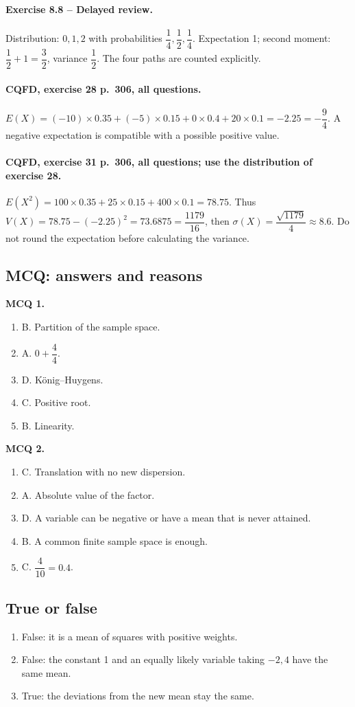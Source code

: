 \paragraph{Exercise 8.8 -- Delayed review.} Distribution: $0,1,2$ with probabilities $\dfrac{1}{4},\dfrac{1}{2},\dfrac{1}{4}$. Expectation 1; second moment: $\dfrac{1}{2}+1=\dfrac{3}{2}$, variance $\dfrac{1}{2}$. The four paths are counted explicitly.
\paragraph{CQFD, exercise 28 p.~306, all questions.} $E(X)=(-10)\times0.35+(-5)\times0.15+0\times0.4+20\times0.1=-2.25=-\dfrac94$. A negative expectation is compatible with a possible positive value.
\paragraph{CQFD, exercise 31 p.~306, all questions; use the distribution of exercise 28.} $E(X^2)=100\times0.35+25\times0.15+400\times0.1=78.75$. Thus $V(X)=78.75-(-2.25)^2=73.6875=\dfrac{1179}{16}$, then $\sigma(X)=\dfrac{\sqrt{1179}}4\approx8.6$. Do not round the expectation before calculating the variance.
\subsection*{MCQ: answers and reasons}
\textbf{MCQ 1.}
\begin{enumerate}
\item B. Partition of the sample space.
\item A. $0+\dfrac{4}{4}$.
\item D. König--Huygens.
\item C. Positive root.
\item B. Linearity.
\end{enumerate}
\textbf{MCQ 2.}
\begin{enumerate}
\item C. Translation with no new dispersion.
\item A. Absolute value of the factor.
\item D. A variable can be negative or have a mean that is never attained.
\item B. A common finite sample space is enough.
\item C. $\dfrac{4}{10}=0.4$.
\end{enumerate}
\subsection*{True or false}
\begin{enumerate}
\item False: it is a mean of squares with positive weights.
\item False: the constant 1 and an equally likely variable taking $-2,4$ have the same mean.
\item True: the deviations from the new mean stay the same.
\end{enumerate}
